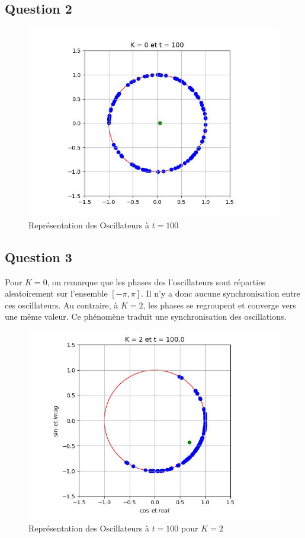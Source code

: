 \documentclass[a4paper, 11pt]{article}
\begin{document}
\subsection*{Question 2}
\begin{figure}[H]
    \centering
    \includegraphics[width=0.49\linewidth]{pics/kura2_100.jpg}
    \caption{Représentation des Oscillateurs à $t=100$}
\end{figure}

\subsection*{Question 3}
Pour $K=0$, on remarque que les phases des l'oscillateurs sont réparties aleatoirement sur l'ensemble $[-\pi, \pi]$. Il n'y a donc aucune synchronisation entre ces oscillateurs. Au contraire, à $K=2$, les phases se regroupent et converge vers une même valeur. Ce phénomène traduit une synchronisation des oscillations.
\begin{figure}[H]
    \centering
    \includegraphics[width=0.49\linewidth]{pics/kura3_100.jpg}
    \caption{Représentation des Oscillateurs à $t=100$ pour $K=2$}
\end{figure}
\end{document}
